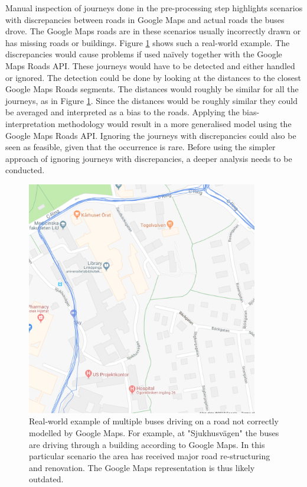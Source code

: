 Manual inspection of journeys done in the pre-processing step highlights scenarios with discrepancies between roads in Google Maps and actual roads the buses drove.
The Google Maps roads are in these scenarios usually incorrectly drawn or has missing roads or buildings.
Figure \ref{fig:gps-map-problem} shows such a real-world example.
The discrepancies would cause problems if used naïvely together with the Google Maps Roads API.
These journeys would have to be detected and either handled or ignored.
The detection could be done by looking at the distances to the closest Google Maps Roads segments.
The distances would roughly be similar for all the journeys, as in Figure \ref{fig:gps-map-problem}.
Since the distances would be roughly similar they could be averaged and interpreted as a bias to the roads.
Applying the bias-interpretation methodology would result in a more generalised model using the Google Maps Roads API.
Ignoring the journeys with discrepancies could also be seen as feasible, given that the occurrence is rare.
Before using the simpler approach of ignoring journeys with discrepancies, a deeper analysis needs to be conducted.

\begin{figure}[ht!]
    \centering
    \includegraphics[width=0.9\textwidth]{figures/gps_map_problem}
    \caption{Real-world example of multiple buses driving on a road not correctly modelled by Google Maps.
    For example, at "Sjukhusvägen" the buses are driving through a building according to Google Maps.
    In this particular scenario the area has received major road re-structuring and renovation.
    The Google Maps representation is thus likely outdated.}
    \label{fig:gps-map-problem}
\end{figure}

